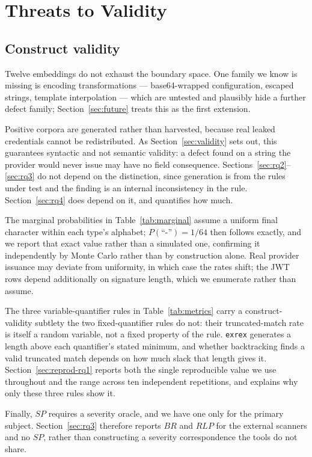 \documentclass[journal]{IEEEtran}
\begin{document}
\section{Threats to Validity}
\label{sec:threats}

\subsection{Construct validity}

Twelve embeddings do not exhaust the boundary space. One family we know is missing is encoding transformations --- base64-wrapped configuration, escaped strings, template interpolation --- which are untested and plausibly hide a further defect family; Section~\ref{sec:future} treats this as the first extension.

Positive corpora are generated rather than harvested, because real leaked credentials cannot be redistributed. As Section~\ref{sec:validity} sets out, this guarantees syntactic and not semantic validity: a defect found on a string the provider would never issue may have no field consequence. Sections~\ref{sec:rq2}--\ref{sec:rq3} do not depend on the distinction, since generation is from the rules under test and the finding is an internal inconsistency in the rule. Section~\ref{sec:rq4} does depend on it, and quantifies how much.

The marginal probabilities in Table~\ref{tab:marginal} assume a uniform final character within each type's alphabet; $P(\text{``-''}) = 1/64$ then follows exactly, and we report that exact value rather than a simulated one, confirming it independently by Monte Carlo rather than by construction alone. Real provider issuance may deviate from uniformity, in which case the rates shift; the JWT rows depend additionally on signature length, which we enumerate rather than assume.

The three variable-quantifier rules in Table~\ref{tab:metrics} carry a construct-validity subtlety the two fixed-quantifier rules do not: their truncated-match rate is itself a random variable, not a fixed property of the rule. \texttt{exrex} generates a length above each quantifier's stated minimum, and whether backtracking finds a valid truncated match depends on how much slack that length gives it. Section~\ref{sec:reprod-rq1} reports both the single reproducible value we use throughout and the range across ten independent repetitions, and explains why only these three rules show it.

Finally, $SP$ requires a severity oracle, and we have one only for the primary subject. Section~\ref{sec:rq3} therefore reports $BR$ and $RLP$ for the external scanners and no $SP$, rather than constructing a severity correspondence the tools do not share.
\end{document}
